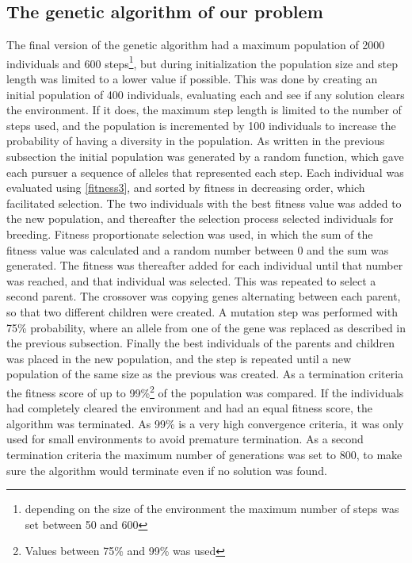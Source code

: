 \subsection{The genetic algorithm of our problem}
The final version of the genetic algorithm had a maximum population of 2000 individuals and 600 steps\footnote{depending on the size of the environment the maximum number of steps was set between 50 and 600 }, but during initialization the population size and step length was limited to a lower value if possible. This was done by creating an initial population of 400 individuals, evaluating each and see if any solution clears the environment. If it does, the maximum step length is limited to the number of steps used, and the population is incremented by 100 individuals to increase the probability of having a diversity in the population. 
As written in the previous subsection the initial population was generated by a random function, which gave each pursuer a sequence of alleles that represented each step.
Each individual was evaluated using \eqref{fitness3}, and sorted by fitness in decreasing order, which facilitated selection.
The two individuals with the best fitness value was added to the new population, and thereafter the selection process selected individuals for breeding. Fitness proportionate selection was used, in which the sum of the fitness value was calculated and a random number between 0 and the sum was generated. The fitness was thereafter added for each individual until that number was reached, and that individual was selected. This was repeated to select a second parent. The crossover was copying genes alternating between each parent, so that two different children were created. A mutation step was performed with 75\% probability, where an allele from one of the gene was replaced as described in the previous subsection. Finally the best individuals of the parents and children was  placed in the new population, and the step is repeated until a new population of the same size as the previous was created.
As a termination criteria the fitness score of up to 99\%\footnote{Values between 75\% and 99\% was used} of the population was compared. If the individuals had completely cleared the environment and had an equal fitness score, the algorithm was terminated. As 99\% is a very high convergence criteria, it was only used for small environments to avoid premature termination. As a second termination criteria the maximum number of generations was set to 800, to make sure the algorithm would terminate even if no solution was found.
